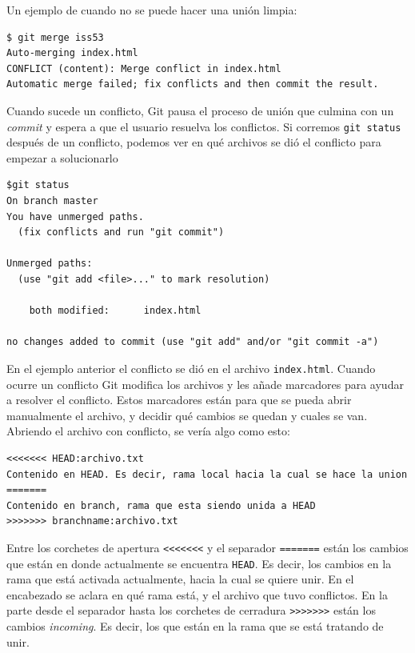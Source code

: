 \documentclass[spanish, 12pt, a4paper]{article}
\begin{document}
Un ejemplo de cuando no se puede hacer una unión limpia:

\begin{lstlisting}
$ git merge iss53
Auto-merging index.html
CONFLICT (content): Merge conflict in index.html
Automatic merge failed; fix conflicts and then commit the result.
\end{lstlisting}

Cuando sucede un conflicto, Git pausa el proceso de unión que culmina
con un \emph{commit} y espera a que el usuario resuelva los conflictos.
Si corremos \passthrough{\lstinline!git status!} después de un
conflicto, podemos ver en qué archivos se dió el conflicto para empezar
a solucionarlo

\begin{lstlisting}
$git status
On branch master
You have unmerged paths.
  (fix conflicts and run "git commit")

Unmerged paths:
  (use "git add <file>..." to mark resolution)

    both modified:      index.html

no changes added to commit (use "git add" and/or "git commit -a")
\end{lstlisting}

En el ejemplo anterior el conflicto se dió en el archivo
\passthrough{\lstinline!index.html!}. Cuando ocurre un conflicto Git
modifica los archivos y les añade marcadores para ayudar a resolver el
conflicto. Estos marcadores están para que se pueda abrir manualmente el
archivo, y decidir qué cambios se quedan y cuales se van. Abriendo el
archivo con conflicto, se vería algo como esto:

\begin{lstlisting}
<<<<<<< HEAD:archivo.txt
Contenido en HEAD. Es decir, rama local hacia la cual se hace la union
=======
Contenido en branch, rama que esta siendo unida a HEAD
>>>>>>> branchname:archivo.txt
\end{lstlisting}

Entre los corchetes de apertura \passthrough{\lstinline!<<<<<<<!} y el
separador \passthrough{\lstinline!=======!} están los cambios que están
en donde actualmente se encuentra \passthrough{\lstinline!HEAD!}. Es
decir, los cambios en la rama que está activada actualmente, hacia la
cual se quiere unir. En el encabezado se aclara en qué rama está, y el
archivo que tuvo conflictos. En la parte desde el separador hasta los
corchetes de cerradura \passthrough{\lstinline!>>>>>>>!} están los
cambios \emph{incoming}. Es decir, los que están en la rama que se está
tratando de unir.
\end{document}
